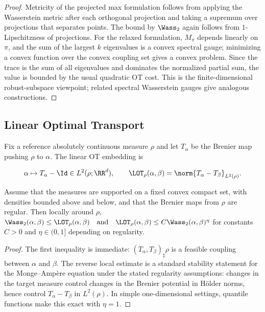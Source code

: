 \begin{proof}
Metricity of the projected max formulation follows from applying the Wasserstein metric after each orthogonal projection and taking a supremum over projections that separates points. The bound by $\Wass_2$ again follows from $1$-Lipschitzness of projections. For the relaxed formulation, $M_\pi$ depends linearly on $\pi$, and the sum of the largest $k$ eigenvalues is a convex spectral gauge; minimizing a convex function over the convex coupling set gives a convex problem. Since the trace is the sum of all eigenvalues and dominates the normalized partial sum, the value is bounded by the usual quadratic OT cost. This is the finite-dimensional robust-subspace viewpoint; related spectral Wasserstein gauges give analogous constructions.
\end{proof}
\subsection{Linear Optimal Transport}
\label{sec-linear-ot}
Fix a reference absolutely continuous measure $\rho$ and let $T_\alpha$ be the Brenier map pushing $\rho$ to $\alpha$. The linear OT embedding is

\begin{equation}\label{eq-lot-embedding}
\alpha \mapsto T_\alpha-\Id\in L^2(\rho;\RR^d),
\qquad
\LOT_\rho(\alpha,\beta)=\norm{T_\alpha-T_\beta}_{L^2(\rho)}.
\end{equation}
\begin{prop}\label{prop-linear-ot-stability}
Assume that the measures are supported on a fixed convex compact set, with densities bounded above and below, and that the Brenier maps from $\rho$ are regular. Then locally around $\rho$,
\(\Wass_2(\alpha,\beta)\leq \LOT_\rho(\alpha,\beta) \quad\text{and}\quad \LOT_\rho(\alpha,\beta)\leq C\Wass_2(\alpha,\beta)^\eta\)
for constants $C>0$ and $\eta\in(0,1]$ depending on regularity.
\end{prop}
\begin{proof}
The first inequality is immediate: $(T_\alpha,T_\beta)_\sharp\rho$ is a feasible coupling between $\alpha$ and $\beta$. The reverse local estimate is a standard stability statement for the Monge--Amp\`ere equation under the stated regularity assumptions: changes in the target measure control changes in the Brenier potential in H\"older norms, hence control $T_\alpha-T_\beta$ in $L^2(\rho)$. In simple one-dimensional settings, quantile functions make this exact with $\eta=1$.
\end{proof}
